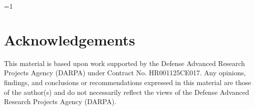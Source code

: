 \documentclass{article}
\providecommand{\PublicVersion}{0}
\begin{document}
\ifnum\PublicVersion=1\relax
\section*{Acknowledgements}
This material is based upon work supported by the Defense Advanced Research
Projects Agency (DARPA) under Contract No. HR001125CE017. Any opinions, findings,
and conclusions or recommendations expressed in this material are those of the
author(s) and do not necessarily reflect the views of the Defense Advanced
Research Projects Agency (DARPA).
\fi

\clearpage
\begingroup
\sloppy


\endgroup

\clearpage
\appendix


\clearpage

\end{document}

